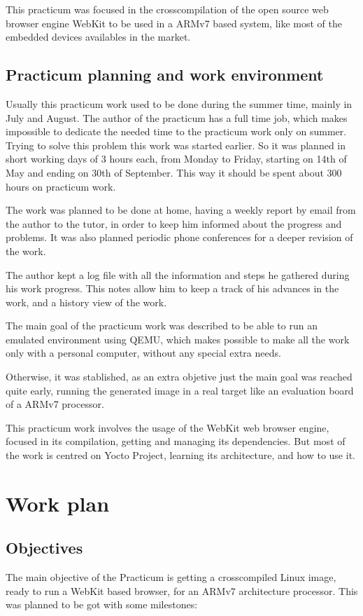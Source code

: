 \documentclass[a4paper,11pt,openany]{report}
\begin{document}
This practicum was focused in the crosscompilation of the open source web browser engine WebKit to be used in a ARMv7 based system, like most of the embedded devices availables in the market. 

\section{Practicum planning and work environment}
Usually this practicum work used to be done during the summer time, mainly in July and August. The author of the practicum has a full time job, which makes impossible to dedicate the needed time to the practicum work only on summer. Trying to solve this problem this work was started earlier. So it was planned in short working days of 3 hours each, from Monday to Friday, starting on 14th of May and ending on 30th of September. This way it should be spent about 300 hours on practicum work.

The work was planned to be done at home, having a weekly report by email from the author to the tutor, in order to keep him informed about the progress and problems. It was also planned periodic phone conferences for a deeper revision of the work.

The author kept a log file with all the information and steps he gathered during his work progress. This notes allow him to keep a track of his advances in the work, and a history view of the work.

The main goal of the practicum work was described to be able to run an emulated environment using QEMU, which makes possible to make all the work only with a personal computer, without any special extra needs.

Otherwise, it was stablished, as an extra objetive just the main goal was reached quite early, running the generated image in a real target like an evaluation board of a ARMv7 processor.

This practicum work involves the usage of the WebKit web browser engine, focused in its compilation, getting and managing its dependencies. But most of the work is centred on Yocto Project, learning its architecture, and how to use it.

\chapter{Work plan}

\section{Objectives}
The main objective of the Practicum is getting a crosscompiled Linux image, ready to run a WebKit based browser, for an ARMv7 architecture processor. This was planned to be got with some milestones:
\end{document}
